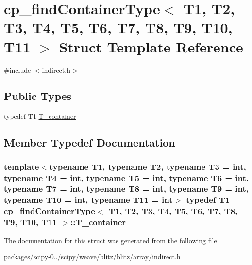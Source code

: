 \hypertarget{structcp__findContainerType}{}\section{cp\+\_\+find\+Container\+Type$<$ T1, T2, T3, T4, T5, T6, T7, T8, T9, T10, T11 $>$ Struct Template Reference}
\label{structcp__findContainerType}


{\ttfamily \#include $<$indirect.\+h$>$}

\subsection*{Public Types}
\begin{DoxyCompactItemize}
\item 
typedef T1 \hyperlink{structcp__findContainerType_a1d83b2532fd0924632410501f90d7962}{T\+\_\+container}
\end{DoxyCompactItemize}


\subsection{Member Typedef Documentation}
\hypertarget{structcp__findContainerType_a1d83b2532fd0924632410501f90d7962}{}
\subsubsection[{T\+\_\+container}]{\setlength{\rightskip}{0pt plus 5cm}template$<$typename T1, typename T2, typename T3  = int, typename T4  = int, typename T5  = int, typename T6  = int, typename T7  = int, typename T8  = int, typename T9  = int, typename T10  = int, typename T11  = int$>$ typedef T1 {\bf cp\+\_\+find\+Container\+Type}$<$ T1, T2, T3, T4, T5, T6, T7, T8, T9, T10, T11 $>$\+::{\bf T\+\_\+container}}\label{structcp__findContainerType_a1d83b2532fd0924632410501f90d7962}


The documentation for this struct was generated from the following file\+:\begin{DoxyCompactItemize}
\item 
packages/scipy-\/0../scipy/weave/blitz/blitz/array/\hyperlink{indirect_8h}{indirect.\+h}\end{DoxyCompactItemize}
